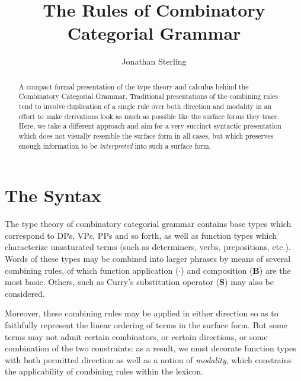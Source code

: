 \documentclass{amsart}
\title{The Rules of Combinatory Categorial Grammar}
\author{Jonathan Sterling}
\begin{document}
\begin{abstract}
  A compact formal presentation of the type theory and calculus behind
  the Combinatory Categorial Grammar. Traditional presentations of the
  combining rules tend to involve duplication of a single rule over both
  direction and modality in an effort to make derivations look as much
  as possible like the surface forms they trace. Here, we take a
  different approach and aim for a very succinct syntactic presentation
  which does not visually resemble the surface form in all cases, but
  which preserves enough information to be \emph{interpreted} into such
  a surface form.
\end{abstract}

\maketitle

\def\ty#1{\ensuremath{\mathsf{#1}}}
\def\con#1{\ensuremath{\mathsf{#1}}}
\def\ident#1{\ensuremath{\operatorname{\mathsf{#1}}}}
\def\induction#1{\mathkw{induction}\ #1}
\def\decide#1{\mathkw{decide}\ #1}



\section{The Syntax}

The type theory of combinatory categorial grammar contains base types
which correspond to DPs, VPs, PPs and so forth, as well as function
types which characterize unsaturated terms (such as determiners, verbs,
prepositions, etc.). Words of these types may be combined into larger
phrases by means of several combining rules, of which function
application ($\cdot$) and composition ($\mathbf{B}$) are the most basic.
Others, such as Curry's substitution operator ($\mathbf{S}$) may also be
considered.

Moreover, these combining rules may be applied in either direction so as
to faithfully represent the linear ordering of terms in the surface
form. But some terms may not admit certain combinators, or certain
directions, or some combination of the two constraints: as a result, we
must decorate function types with both permitted direction as well as a
notion of \emph{modality}, which constrains the applicability of
combining rules within the lexicon.
\end{document}

